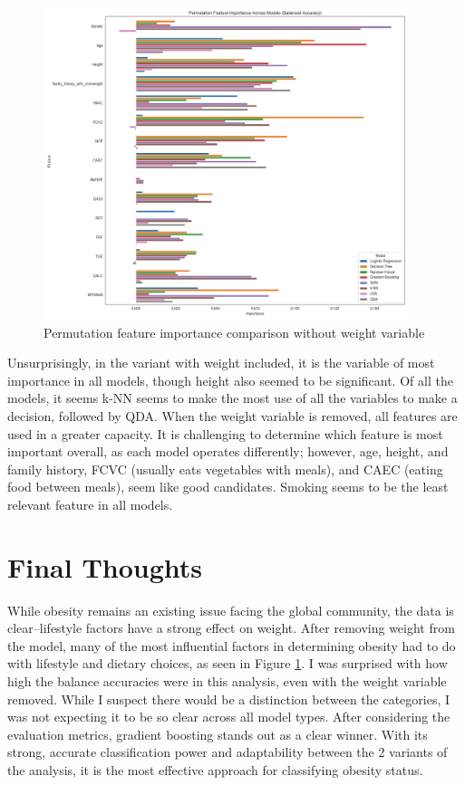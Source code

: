\documentclass[a4paper,12pt]{article}
\begin{document}
\begin{figure}[H]
\centering
\includegraphics[width=0.95\textwidth]{Feature_Importance_noWeight.png}
\caption{Permutation feature importance comparison without weight variable}
\label{fig:feature_importance_withoutWeight}
\end{figure}

Unsurprisingly, in the variant with weight included, it is the variable of most importance in all models, though height also seemed to be significant. Of all the models, it seems k-NN seems to make the most use of all the variables to make a decision, followed by QDA. When the weight variable is removed, all features are used in a greater capacity. It is challenging to determine which feature is most important overall, as each model operates differently; however, age, height, and family history, FCVC (usually eats vegetables with meals), and CAEC (eating food between meals), seem like good candidates. Smoking seems to be the least relevant feature in all models.

\section{Final Thoughts}
While obesity remains an existing issue facing the global community, the data is clear--lifestyle factors have a strong effect on weight. After removing weight from the model, many of the most influential factors in determining obesity had to do with lifestyle and dietary choices, as seen in Figure \ref{fig:feature_importance_withoutWeight}. I was surprised with how high the balance accuracies were in this analysis, even with the weight variable removed. While I suspect there would be a distinction between the categories, I was not expecting it to be so clear across all model types. After considering the evaluation metrics, gradient boosting stands out as a clear winner. With its strong, accurate classification power and adaptability between the 2 variants of the analysis, it is the most effective approach for classifying obesity status. 


\newpage
\end{document}
